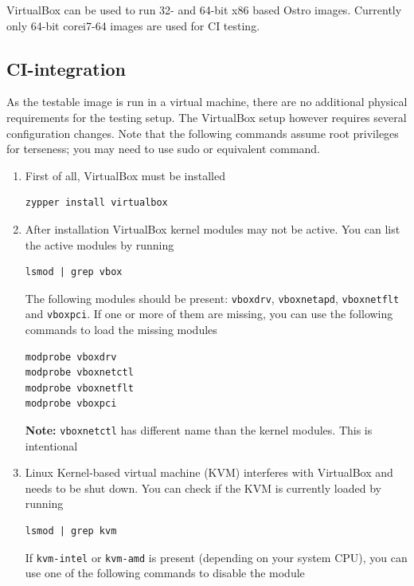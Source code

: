 \documentclass[a4paper,11pt]{article}
\newcommand{\note}{\textbf{Note: }}
\newcommand{\cmd}[1]{\texttt{#1}}
\begin{document}
VirtualBox can be used to run 32- and 64-bit x86 based Ostro images. Currently only 64-bit corei7-64 images are used for CI testing.

\subsection{CI-integration}

As the testable image is run in a virtual machine, there are no additional physical requirements for the testing setup. The VirtualBox setup however requires several configuration changes. Note that the following commands assume root privileges for terseness; you may need to use sudo or equivalent command.

\begin{enumerate}

\item
First of all, VirtualBox must be installed

\begin{lstlisting}
zypper install virtualbox
\end{lstlisting}

\item 
After installation VirtualBox kernel modules may not be active. You can list the active modules by running

\begin{lstlisting}
lsmod | grep vbox
\end{lstlisting}

The following modules should be present: \cmd{vboxdrv}, \cmd{vboxnetapd}, \cmd{vboxnetflt} and \cmd{vboxpci}. If one or more of them are missing, you can use the following commands to load the missing modules

\begin{lstlisting}
modprobe vboxdrv
modprobe vboxnetctl
modprobe vboxnetflt
modprobe vboxpci
\end{lstlisting}

\note \cmd{vboxnetctl} has different name than the kernel modules. This is intentional

\item
Linux Kernel-based virtual machine (KVM) interferes with VirtualBox and needs to be shut down. You can check if the KVM is currently loaded by running

\begin{lstlisting}
lsmod | grep kvm
\end{lstlisting}

If \cmd{kvm-intel} or \cmd{kvm-amd} is present (depending on your system CPU), you can use one of the following commands to disable the module


\end{enumerate}
\end{document}
